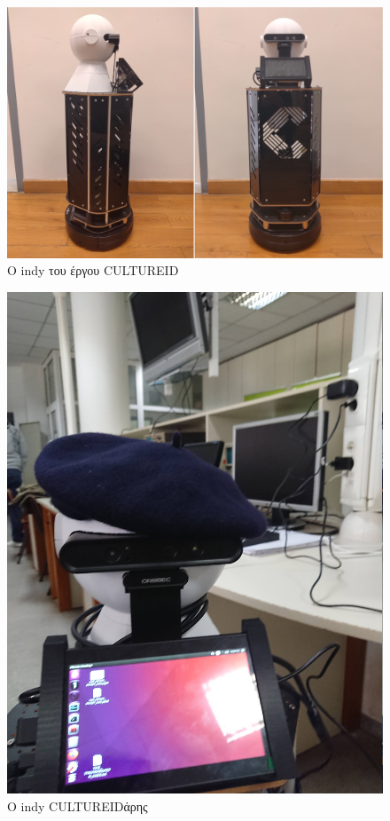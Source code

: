 \begin{figure}[H]\centering
  \includegraphics[scale=0.2]{./figures/parts/appendix/chapters/06/indy.png}
  \caption{\small Ο indy του έργου CULTUREID}
\end{figure}
\begin{figure}[H]\centering
  \includegraphics[scale=0.1]{./figures/parts/appendix/chapters/06/indee.jpg}
  \caption{\small Ο indy CULTUREIDάρης}
\end{figure}



